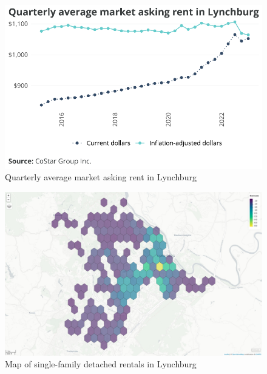 \documentclass[
  letterpaper,
  DIV=11,
  numbers=noendperiod]{scrreprt}
\begin{document}
\begin{figure}[H]

{\centering \includegraphics{./part-3-3_files/figure-pdf/fig-rent-1.pdf}

}

\caption{\label{fig-rent}Quarterly average market asking rent in
Lynchburg}

\end{figure}

\begin{figure}[H]

{\centering \includegraphics{./part-3-3_files/figure-pdf/fig-sfr-1.pdf}

}

\caption{\label{fig-sfr}Map of single-family detached rentals in
Lynchburg}

\end{figure}
\end{document}
